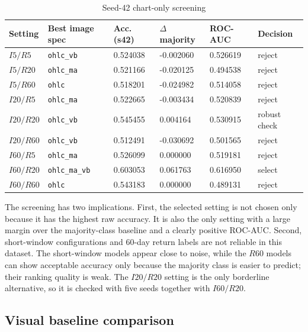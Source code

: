 \documentclass[14pt,a4paper]{extarticle}
\newcommand{\code}[1]{\texttt{#1}}
\begin{document}
\begin{table}[H]
\caption{Seed-42 chart-only screening}
\begin{center}
\small
\setlength{\tabcolsep}{3pt}
\begin{tabular}{p{}p{}p{}p{}p{}p{}}
\toprule
\textbf{Setting} & \textbf{Best image spec} & \textbf{Acc. (s42)} & \textbf{$\Delta$ majority} & \textbf{ROC-AUC} & \textbf{Decision}\\
\midrule
$I5/R5$ & \code{ohlc\_vb} & 0.524038 & -0.002060 & 0.526619 & reject\\
$I5/R20$ & \code{ohlc\_ma} & 0.521166 & -0.020125 & 0.494538 & reject\\
$I5/R60$ & \code{ohlc} & 0.518201 & -0.024982 & 0.514058 & reject\\
$I20/R5$ & \code{ohlc\_ma} & 0.522665 & -0.003434 & 0.520839 & reject\\
$I20/R20$ & \code{ohlc\_vb} & 0.545455 & 0.004164 & 0.530915 & robust check\\
$I20/R60$ & \code{ohlc\_vb} & 0.512491 & -0.030692 & 0.501565 & reject\\
$I60/R5$ & \code{ohlc\_ma} & 0.526099 & 0.000000 & 0.519181 & reject\\
$I60/R20$ & \code{ohlc\_ma\_vb} & 0.603053 & 0.061763 & 0.616950 & select\\
$I60/R60$ & \code{ohlc} & 0.543183 & 0.000000 & 0.489131 & reject\\
\bottomrule
\end{tabular}
\end{center}
\end{table}

The screening has two implications. First, the selected setting is not chosen only because it has the highest raw accuracy. It is also the only setting with a large margin over the majority-class baseline and a clearly positive ROC-AUC. Second, short-window configurations and 60-day return labels are not reliable in this dataset. The short-window models appear close to noise, while the $R60$ models can show acceptable accuracy only because the majority class is easier to predict; their ranking quality is weak. The $I20/R20$ setting is the only borderline alternative, so it is checked with five seeds together with $I60/R20$.

\subsection{Visual baseline comparison}
\end{document}
